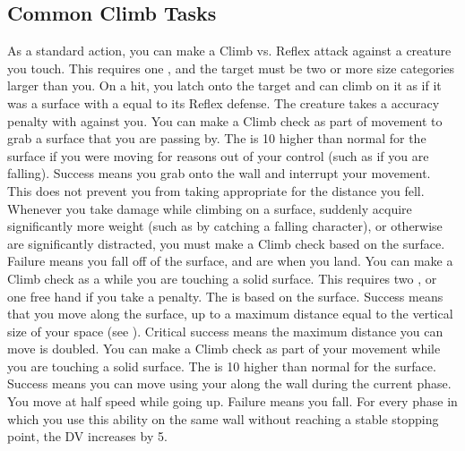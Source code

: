     \subsection{Common Climb Tasks}
         As a standard action, you can make a Climb vs. Reflex attack against a creature you touch.
        This requires one , and the target must be two or more size categories larger than you.
        On a hit, you latch onto the target and can climb on it as if it was a surface with a  equal to its Reflex defense.
        The creature takes a  accuracy penalty with  against you.
         You can make a Climb check as part of movement to grab a surface that you are passing by.
        The  is 10 higher than normal for the surface if you were moving for reasons out of your control (such as if you are falling).
        Success means you grab onto the wall and interrupt your movement.
        This does not prevent you from taking  appropriate for the distance you fell.
         Whenever you take damage while climbing on a surface, suddenly acquire significantly more weight (such as by catching a falling character), or otherwise are significantly distracted, you must make a Climb check based on the surface.
        Failure means you fall off of the surface, and are \prone when you land.
         You can make a Climb check as a  while you are touching a solid surface.
        This requires two , or one free hand if you take a  penalty.
        The  is based on the surface.
        Success means that you move along the surface, up to a maximum distance equal to the vertical size of your space (see ).
        Critical success means the maximum distance you can move is doubled.
         You can make a Climb check as part of your movement while you are touching a solid surface.
        The  is 10 higher than normal for the surface.
        Success means you can move using your  along the wall during the current phase.
        You move at half speed while going up.
        Failure means you fall.
        For every phase in which you use this ability on the same wall without reaching a stable stopping point, the DV increases by 5.

